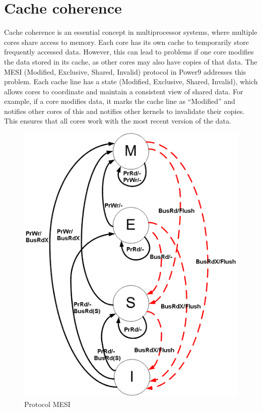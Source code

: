 \documentclass{report}
\begin{document}
\section{Cache coherence}
Cache coherence is an essential concept in multiprocessor systems, where multiple cores share access to memory. 
Each core has its own cache to temporarily store frequently accessed data. However, this can lead to problems 
if one core modifies the data stored in its cache, as other cores may also have copies of that data. The MESI 
(Modified, Exclusive, Shared, Invalid) protocol in Power9 addresses this problem. Each cache line has a state 
(Modified, Exclusive, Shared, Invalid), which allows cores to coordinate and maintain a consistent view of 
shared data. For example, if a core modifies data, it marks the cache line as ``Modified''  and notifies other
cores of this and notifies other kernels to invalidate their copies. This ensures that all cores work with
the most recent version of the data.

\begin{figure}[H]
  \centering
  \includegraphics[scale=0.4]{img/mesi.png}
  \caption{Protocol MESI}
  \label{fig:Protocol MESI}
\end{figure}
\end{document}
